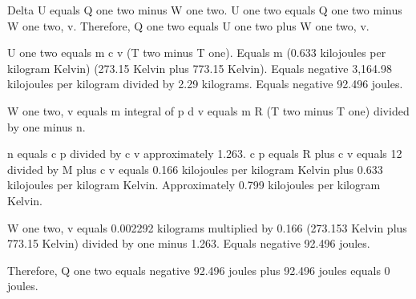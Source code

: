 Delta U equals Q one two minus W one two.  
U one two equals Q one two minus W one two, v.  
Therefore, Q one two equals U one two plus W one two, v.  

U one two equals m c v (T two minus T one).  
Equals m (0.633 kilojoules per kilogram Kelvin) (273.15 Kelvin plus 773.15 Kelvin).  
Equals negative 3,164.98 kilojoules per kilogram divided by 2.29 kilograms.  
Equals negative 92.496 joules.  

W one two, v equals m integral of p d v equals m R (T two minus T one) divided by one minus n.  

n equals c p divided by c v approximately 1.263.  
c p equals R plus c v equals 12 divided by M plus c v equals 0.166 kilojoules per kilogram Kelvin plus 0.633 kilojoules per kilogram Kelvin.  
Approximately 0.799 kilojoules per kilogram Kelvin.  

W one two, v equals 0.002292 kilograms multiplied by 0.166 (273.153 Kelvin plus 773.15 Kelvin) divided by one minus 1.263.  
Equals negative 92.496 joules.  

Therefore, Q one two equals negative 92.496 joules plus 92.496 joules equals 0 joules.